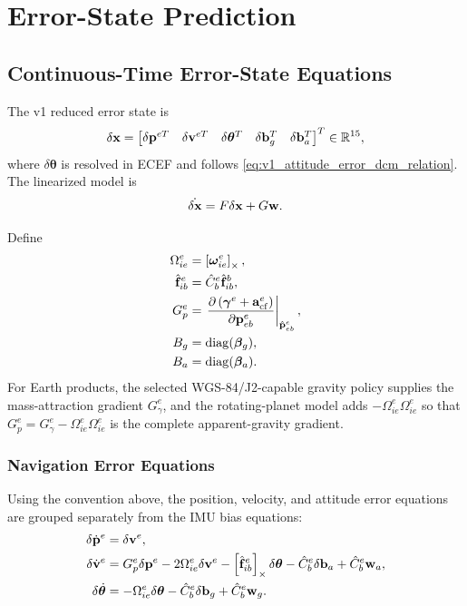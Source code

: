 \chapter{Error-State Prediction}
\label{chap:error_state_prediction}

\section{Continuous-Time Error-State Equations}

The v1 reduced error state is
\begin{equation}
\delta\mathbf{x} =
\begin{bmatrix}
\delta\mathbf{p}^{eT} &
\delta\mathbf{v}^{eT} &
\delta\boldsymbol{\theta}^{T} &
\delta\mathbf{b}_g^{T} &
\delta\mathbf{b}_a^{T}
\end{bmatrix}^{T}
\in\mathbb{R}^{15},
\end{equation}
where $\delta\boldsymbol{\theta}$ is resolved in ECEF and follows
\cref{eq:v1_attitude_error_dcm_relation}. The linearized model is
\begin{equation}
\dot{\delta\mathbf{x}}
=
F\delta\mathbf{x}+G\mathbf{w}.
\label{eq:v1_error_state_space}
\end{equation}

Define
\begin{align}
\Omega_{ie}^{e} &= \left[\boldsymbol{\omega}_{ie}^{e}\right]_{\times},\\
\hat{\mathbf{f}}_{ib}^{e} &= \hat{C}_b^e\hat{\mathbf{f}}_{ib}^{b},\\
G_p^e &=
\left.
\frac{\partial
\left(
\boldsymbol{\gamma}^e+\mathbf{a}_{\mathrm{cf}}^e
\right)}
{\partial\mathbf{p}_{eb}^e}
\right|_{\hat{\mathbf{p}}_{eb}^{e}},\\
B_g &= \operatorname{diag}(\boldsymbol{\beta}_g),\\
B_a &= \operatorname{diag}(\boldsymbol{\beta}_a).
\end{align}
For Earth products, the selected WGS-84/J2-capable gravity policy supplies
the mass-attraction gradient $G_\gamma^e$, and the rotating-planet model adds
$-\Omega_{ie}^e\Omega_{ie}^e$ so that
$G_p^e=G_\gamma^e-\Omega_{ie}^e\Omega_{ie}^e$ is the complete
apparent-gravity gradient.

\subsection{Navigation Error Equations}

Using the convention above, the position, velocity, and attitude error
equations are grouped separately from the IMU bias equations:
\begin{align}
\delta\dot{\mathbf{p}}^{e}
&=
\delta\mathbf{v}^{e},\\
\delta\dot{\mathbf{v}}^{e}
&=
G_p^e\delta\mathbf{p}^{e}
-
2\Omega_{ie}^{e}\delta\mathbf{v}^{e}
-
\left[\hat{\mathbf{f}}_{ib}^{e}\right]_{\times}\delta\boldsymbol{\theta}
-
\hat{C}_b^e\delta\mathbf{b}_a
+
\hat{C}_b^e\mathbf{w}_a,\\
\delta\dot{\boldsymbol{\theta}}
&=
-
\Omega_{ie}^{e}\delta\boldsymbol{\theta}
-
\hat{C}_b^e\delta\mathbf{b}_g
+
\hat{C}_b^e\mathbf{w}_g.
\end{align}


